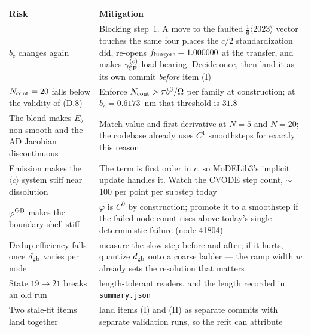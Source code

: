 \documentclass[11pt]{article}
\newcommand{\cloop}{\ensuremath{\langle c\rangle}}
\newcommand{\MoD}{\textsf{MoDELib3}}
\newcommand{\fbk}{\discretionary{}{}{}}   %
\newcommand{\file}[1]{\texttt{\small #1}}
\newcommand{\GSF}{\gamma_{\rm SF}}
\begin{document}
\begin{center}\small
\begin{tabular}{@{}p{}p{}@{}}
\toprule
\textbf{Risk} & \textbf{Mitigation}\\
\midrule
$b_c$ changes again & Blocking step~1.  A move to the faulted
  $\tfrac16\langle20\bar23\rangle$ vector touches the same four places the
  $c/2$ standardization did, re-opens $f_{\rm burgers}=1.000000$ at the
  transfer, and makes $\GSF^{(c)}$ load-bearing.  Decide once, then land it as
  its own commit \emph{before} item (I)\\
$N_{\rm cont}=20$ falls below the validity of (D.8) & Enforce
  $N_{\rm cont}>\pi b^{3}/\Omega$ per family at construction; at
  $b_c=0.6173$~nm that threshold is $31.8$\\
The blend makes $E_b$ non-smooth and the AD Jacobian discontinuous & Match
  value and first derivative at $N=5$ and $N=20$; the codebase already uses
  $C^{1}$ smoothsteps for exactly this reason\\
Emission makes the \cloop{} system stiff near dissolution & The term is first
  order in $c$, so \MoD{}'s implicit update handles it.  Watch the CVODE step
  count, $\sim$100 per point per substep today\\
$\varphi^{\rm GB}$ makes the boundary shell stiff & $\varphi$ is $C^{0}$ by
  construction; promote it to a smoothstep if the failed-node count rises
  above today's single deterministic failure (node 41804)\\
Dedup efficiency falls once $d_{\rm gb}$ varies per node & measure the slow
  step before and after; if it hurts, quantize $d_{\rm gb}$ onto a coarse
  ladder --- the ramp width $w$ already sets the resolution that matters\\
State $19\to21$ breaks an old run & length-tolerant readers, and the length
  recorded in \file{summary.\fbk json}\\
Two stale-fit items land together & land items (I) and (II) as separate
  commits with separate validation runs, so the refit can attribute\\
\bottomrule
\end{tabular}
\end{center}
\end{document}
